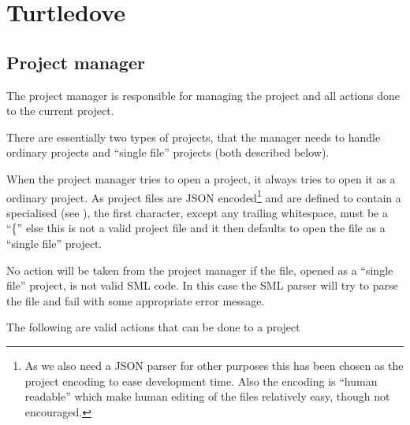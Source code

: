 

\section{Turtledove}
\label{sec:design-turtledove}





\subsection{Project manager}
\label{sec:design-project-manager}

The project manager is responsible for managing the project and all actions done
to the current project. 

There are essentially two types of projects, that the manager needs to handle
ordinary projects and ``single file'' projects (both described below). 

When the project manager tries to open a project, it always tries to open it as
a ordinary project. As project files are JSON encoded\footnote{As we also need a
  JSON parser for other purposes this has been chosen as the project encoding to
  ease development time. Also the encoding is ``human readable'' which make
  human editing of the files relatively easy, though not encouraged.} and are
defined to contain a specialised  (see
), the first character, except any trailing whitespace,
must be a ``\{'' else this is not a valid project file and it then defaults to
open the file as a ``single file'' project.

No action will be taken from the project manager if the file, opened as a
``single file'' project, is not valid SML code. In this case the SML parser will
try to parse the file and fail with some appropriate error message.

The following are valid actions that can be done to a project

